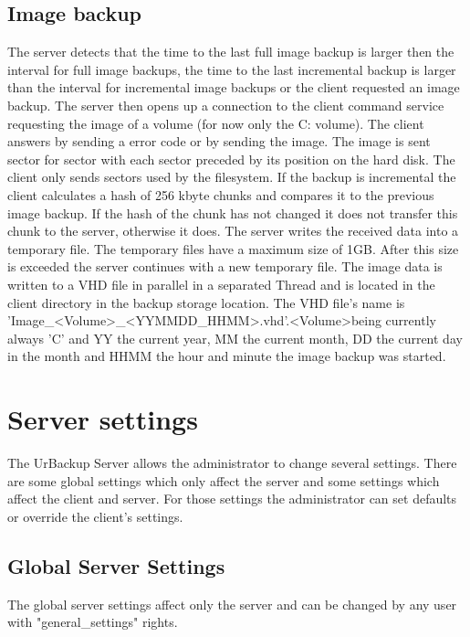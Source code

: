 \documentclass[a4paper,10pt]{article}
\begin{document}
\subsection{Image backup}

The server detects that the time to the last full image backup is larger then the interval for full image backups, the time to the last incremental backup is larger than the interval for incremental image backups or the client requested an image backup. The server then opens up a connection to the client command service requesting the image of a volume (for now only the C: volume). The client answers by sending a error code or by sending the image. The image is sent sector for sector with each sector preceded by its position on the hard disk. The client only sends sectors used by the filesystem. If the backup is incremental the client calculates a hash of 256 kbyte chunks and compares it to the previous image backup. If the hash of the chunk has not changed it does not transfer this chunk to the server, otherwise it does. The server writes the received data into a temporary file. The temporary files have a maximum size of 1GB. After this size is exceeded the server continues with a new temporary file. The image data is written to a VHD file in parallel in a separated Thread and is located in the client directory in the backup storage location. The VHD file's name is 'Image\_\textless Volume\textgreater\_\textless YYMMDD\_HHMM\textgreater.vhd'.\textless Volume\textgreater  being currently always 'C' and YY the current year, MM the current month, DD the current day in the month and HHMM the hour and minute the image backup was started.

\section{Server settings}
\label{server_settings}

The UrBackup Server allows the administrator to change several settings. There are some global settings which only affect the server and some settings which affect the client and server. For those settings the administrator can set defaults or override the client's settings.

\subsection{Global Server Settings}

The global server settings affect only the server and can be changed by any user with "general\_settings" rights.
\end{document}
